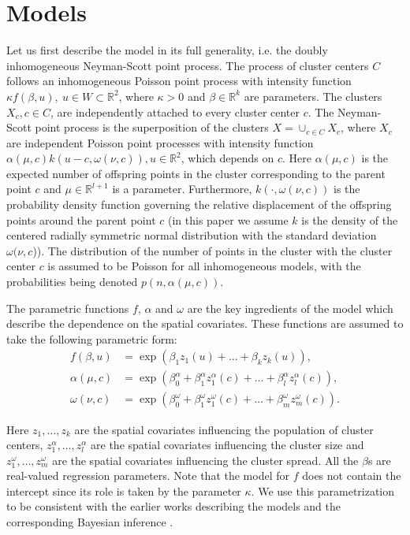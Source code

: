 \section{Models} \label{models}

Let us first describe the model in its full generality, i.e. the doubly inhomogeneous Neyman-Scott point process. The process of cluster centers $C$ follows an inhomogeneous Poisson point process
with intensity function $\kappa f (\beta, u), \ u\in W \subset \mathbb{R}^2$, where $\kappa > 0$ 
and $\beta \in \mathbb{R}^k$ are parameters. The clusters $X_c, c \in C$, 
are independently attached to every cluster center $c$. 
The Neyman-Scott point process is the superposition of the clusters 
$X=\cup_{c\in C} X_c$, where $X_c$ 
are independent Poisson point processes with intensity function 
$\alpha (\mu,c)k(u-c, \omega (\nu,c)), u \in \mathbb{R}^2$,
which depends on $c$.
Here $\alpha(\mu, c)$ is the expected number of offspring points in the cluster corresponding to the parent point $c$ and $\mu \in \mathbb{R}^{l+1}$ is a 
parameter. Furthermore, $k(\cdot, \omega(\nu, c))$ is the probability density function governing the relative displacement of the offspring points around the parent 
point $c$ (in this paper we assume $k$ is the density of the centered radially symmetric normal distribution with the standard deviation $\omega(\nu, c$)). The 
distribution of the number of points in the cluster with the cluster center $c$ is assumed to be Poisson for all inhomogeneous models, with the probabilities being 
denoted $p(n, \alpha(\mu, c))$.

The parametric functions $f$, $\alpha$ and $\omega$ are the key ingredients of the model which describe the dependence on the spatial covariates. These functions are assumed to take the following parametric form:
\begin{align*}
    f(\beta,u) & = \exp(\beta_1 z_1(u)+\ldots + \beta_k z_k(u)), \\
    \alpha(\mu,c) & = \exp(\beta^\alpha_0+\beta^\alpha_1 z^\alpha_1(c)+\ldots + \beta^\alpha_l z^\alpha_l(c)), \\
    \omega(\nu,c) & = \exp(\beta^\omega_0+\beta^\omega_1 z^\omega_1(c)+\ldots + \beta^\omega_m z^\omega_m(c)).
\end{align*}

Here $z_1, \ldots , z_k$ are the spatial covariates influencing the population of cluster centers, $z_1^\alpha, \ldots , z_l^\alpha$ are the spatial covariates influencing the cluster size and $z_1^\omega, \ldots , z_m^\omega$ are the spatial covariates influencing the cluster spread. All the $\beta$s are real-valued regression parameters. Note that the model for $f$ does not contain the intercept since its role is taken by the parameter $\kappa$. We use this parametrization to be consistent with the earlier works describing the models and the corresponding Bayesian inference \citep{M2014,KM2016,MS2017}.

